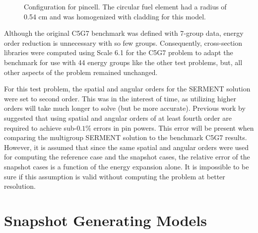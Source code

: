 \begin{figure*}[htb]
    \centering
    \caption{Configuration for pincell.  The circular fuel element had a 
             radius of 0.54 cm and was homogenized with cladding for this 
             model.}
    \label{fig:pin_cell_config}
\end{figure*}

Although the original C5G7 benchmark was defined with 7-group data, energy order 
reduction is 
unnecessary with so few groups.  Consequently, cross-section libraries 
were computed using Scale 6.1 for the C5G7 problem to adapt the benchmark for 
use with 44 energy groups like the other test problems, but, all 
other 
aspects of the problem remained unchanged.  

For this test problem, the spatial and angular orders for the SERMENT 
solution were set to second order.  This was in the interest of time, as 
utilizing higher orders will take much longer to solve (but be more accurate).  
Previous work by \citet{Roberts2014} suggested that using spatial and angular 
orders of at least fourth order are required to achieve sub-$0.1\%$ errors in 
pin powers.  This error will be present when 
comparing 
the multigroup SERMENT solution to the benchmark C5G7 results.  However, 
it is assumed that since the same spatial and angular orders were used for 
computing the reference case and the snapshot cases, the relative error 
of the snapshot cases is a function of the energy expansion alone.  It is 
impossible to be sure if this assumption is valid without computing the problem 
at better resolution.

\section{Snapshot Generating Models}

